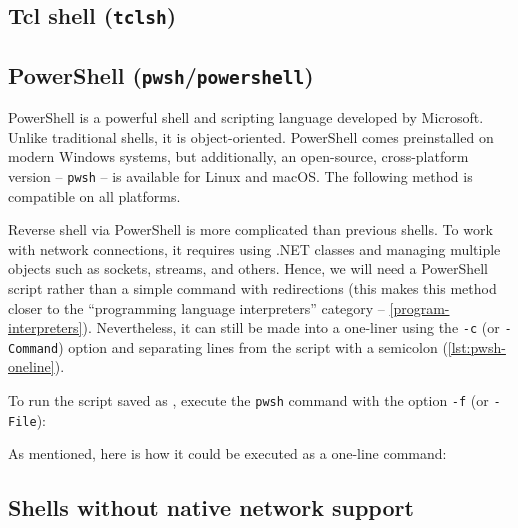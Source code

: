 
\subsection{Tcl shell (\texttt{tclsh})}

\TODO{}


\subsection{PowerShell (\texttt{pwsh}/\texttt{powershell})}


PowerShell is a powerful shell and scripting language developed by Microsoft. Unlike traditional shells, it is object-oriented. PowerShell comes preinstalled on modern Windows systems, but additionally, an open-source, cross-platform version -- \texttt{pwsh} -- is available for Linux and macOS. The following method is compatible on all platforms.

Reverse shell via PowerShell is more complicated than previous shells. To work with network connections, it requires using .NET classes and managing multiple objects such as sockets, streams, and others. Hence, we will need a PowerShell script rather than a simple command with redirections (this makes this method closer to the ``programming language interpreters'' category -- \cref{program-interpreters}). Nevertheless, it can still be made into a one-liner using the \texttt{-c} (or \texttt{-Command}) option and separating lines from the script with a semicolon (\cref{lst:pwsh-oneline}).



To run the script saved as \scriptfile , execute the \texttt{pwsh} command with the option \texttt{-f} (or \texttt{-File}):


As mentioned, here is how it could be executed as a one-line command:



\subsection{Shells without native network support}
\label{no-network-shells}

